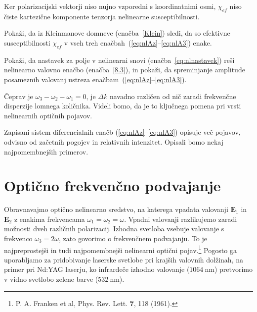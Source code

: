 Ker polarizacijski vektorji niso nujno vzporedni s koordinatnimi osmi, $\chi_{ef}$ 
niso čiste kartezične komponente tenzorja nelinearne susceptibilnosti.
\begin{naloga}
Pokaži, da iz Kleinmanove domneve (enačba~\ref{Klein}) sledi, da so 
efektivne susceptibilnosti $\chi_{ef}$ v vseh treh enačbah~(\ref{eq:nlAz}--\ref{eq:nlA3}) enake.
\end{naloga}
\begin{naloga}
Pokaži, da nastavek za polje v nelinearni snovi (enačba~\ref{eq:nlnastavek}) reši nelinearno
valovno enačbo (enačba~\ref{8.3}), in pokaži, da spreminjanje amplitude posameznih valovanj 
ustreza enačbam~(\ref{eq:nlAz}--\ref{eq:nlA3}).
\end{naloga}
Čeprav je $\omega_{3}-\omega_{2}-\omega_{1}=0$, je $\Delta k$ navadno različen od nič zaradi 
frekvenčne disperzije lomnega količnika. Videli bomo, da je to ključnega pomena 
pri vrsti nelinearnih optičnih pojavov. 

Zapisani sistem diferencialnih enačb (\ref{eq:nlAz}--\ref{eq:nlA3}) opisuje več pojavov, 
odvisno od začetnih pogojev in relativnih intenzitet. Opisali bomo nekaj
najpomembnejših primerov.

\section{Optično frekvenčno podvajanje}
\label{chap:SHG}
Obravnavajmo optično nelinearno sredstvo, na katerega vpadata valovanji ${\mathbf E}_1$ in
$\mathbf{E}_2$ z enakima frekvencama $\omega_{1}=\omega_{2}=\omega$. Vpadni valovanji
razlikujemo zaradi možnosti dveh različnih polarizacij. Izhodna svetloba vsebuje valovanje
s frekvenco $\omega_{3}=2\omega$, zato govorimo o frekvenčnem 
podvajanju. To je
najpreprostejši in tudi najpomembnejši nelinearni optični pojav.\footnote{P. A. Franken et al, Phys. Rev. Lett.
$\mathbf{7}$, 118 (1961).} 
Pogosto ga uporabljamo za pridobivanje laserske svetlobe pri krajših valovnih dolžinah, na primer
pri Nd:YAG laserju, ko infrardeče izhodno valovanje ($1064~\si{\nano\metre}$) 
pretvorimo v vidno svetlobo zelene barve ($532~\si{\nano\metre}$). 


